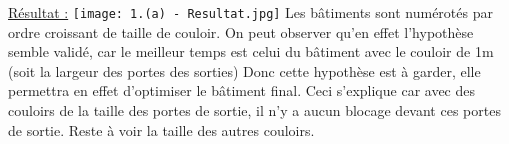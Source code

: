 \documentclass[12pt]{article}
\begin{document}
\underline{Résultat :}
\newline
\texttt{[image: 1.(a) - Resultat.jpg]}\newline
\newline
Les bâtiments sont numérotés par ordre croissant de taille de couloir.
\newline\newline
On peut observer qu'en effet l'hypothèse semble validé, car le meilleur temps est celui du bâtiment avec le couloir de 1m (soit la largeur des portes des sorties)
\newline
Donc cette hypothèse est à garder, elle permettra en effet d'optimiser le bâtiment final.
\newline
Ceci s'explique car avec des couloirs de la taille des portes de sortie, il n'y a aucun blocage devant ces portes de sortie. Reste à voir la taille des autres couloirs.
\end{document}
